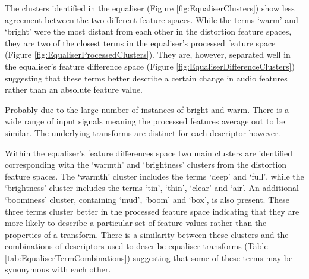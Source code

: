 		The clusters identified in the equaliser (Figure \ref{fig:EqualiserClusters}) show less agreement between
		the two different feature spaces. While the terms `warm' and `bright' were the most distant from each other
		in the distortion feature spaces, they are two of the closest terms in the equaliser's processed feature
		space (Figure \ref{fig:EqualiserProcessedClusters}). They are, however, separated well in the equaliser's
		feature difference space (Figure \ref{fig:EqualiserDifferenceClusters}) suggesting that these terms better
		describe a certain change in audio features rather than an absolute feature value.

		\note
		{
			Probably due to the large number of instances of bright and warm. There is a wide range of input
			signals meaning the processed features average out to be similar. The underlying transforms are
			distinct for each descriptor however.
		}
		
		Within the equaliser's feature differences space two main clusters are identified corresponding with the
		`warmth' and `brightness' clusters from the distortion feature spaces. The `warmth' cluster includes the
		terms `deep' and `full', while the `brightness' cluster includes the terms `tin', `thin', `clear' and
		`air'. An additional `boominess' cluster, containing `mud', `boom' and `box', is also present. These three
		terms cluster better in the processed feature space indicating that they are more likely to describe a
		particular set of feature values rather than the properties of a transform. There is a similarity between
		these clusters and the combinations of descriptors used to describe equaliser transforms (Table
		\ref{tab:EqualiserTermCombinations}) suggesting that some of these terms may be synonymous with each other.

